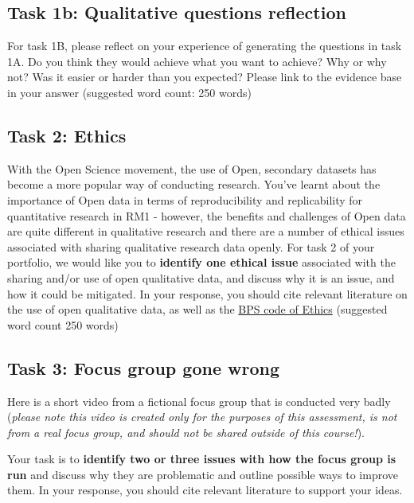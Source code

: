 \documentclass[
  english,
  letterpaper,
  DIV=11,
  numbers=noendperiod]{scrreprt}
\begin{document}
\subsection{Task 1b: Qualitative questions
reflection}\label{task-1b-qualitative-questions-reflection}

For task 1B, please reflect on your experience of generating the
questions in task 1A. Do you think they would achieve what you want to
achieve? Why or why not? Was it easier or harder than you expected?
Please link to the evidence base in your answer (suggested word count:
250 words)

\subsection{Task 2: Ethics}\label{task-2-ethics}

With the Open Science movement, the use of Open, secondary datasets has
become a more popular way of conducting research. You've learnt about
the importance of Open data in terms of reproducibility and
replicability for quantitative research in RM1 - however, the benefits
and challenges of Open data are quite different in qualitative research
and there are a number of ethical issues associated with sharing
qualitative research data openly. For task 2 of your portfolio, we would
like you to \textbf{identify one ethical issue} associated with the
sharing and/or use of open qualitative data, and discuss why it is an
issue, and how it could be mitigated. In your response, you should cite
relevant literature on the use of open qualitative data, as well as the
\href{https://cms.bps.org.uk/sites/default/files/2022-06/BPS\%20Code\%20of\%20Human\%20Research\%20Ethics\%20(1).pdf}{BPS
code of Ethics} (suggested word count 250 words)

\subsection{Task 3: Focus group gone
wrong}\label{task-3-focus-group-gone-wrong}

Here is a short video from a fictional focus group that is conducted
very badly (\emph{please note this video is created only for the
purposes of this assessment, is not from a real focus group, and should
not be shared outside of this course!}).

Your task is to \textbf{identify two or three issues with how the focus
group is run} and discuss why they are problematic and outline possible
ways to improve them. In your response, you should cite relevant
literature to support your ideas.
\end{document}
